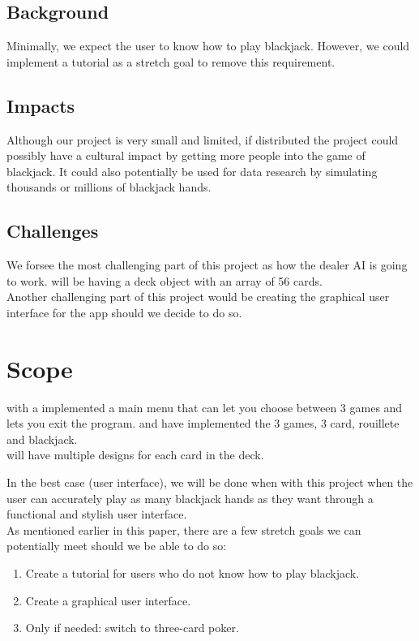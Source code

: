 \documentclass[10pt,conference,onecolumn,compsoc]{IEEEtran}
\begin{document}
\subsection{Background}
Minimally, we expect the user to know how to play blackjack. However, we could implement a tutorial as a stretch goal to remove this requirement.

\subsection{Impacts}
Although our project is very small and limited, if distributed the project could possibly have a cultural impact by getting more people into the game of blackjack. It could also potentially be used for data research by simulating thousands or millions of blackjack hands.
\subsection{Challenges}
We forsee the most challenging part of this project as how the dealer AI is going to work. will be having a deck object with an array of 56 cards. 
\\
Another challenging part of this project would be creating the graphical user interface for the app should we decide to do so.



\section{Scope}
with a implemented a main menu that can let you choose between 3 games and lets you exit the program. and have implemented the 3 games, 3 card, rouillete and blackjack.\\
will have multiple designs for each card in the deck. 

In the best case (user interface), we will be done when with this project when the user can accurately play as many blackjack hands as they want through a functional and stylish user interface.\\
As mentioned earlier in this paper, there are a few stretch goals we can potentially meet should we be able to do so:\\

\begin{enumerate}
\item Create a tutorial for users who do not know how to play blackjack.
\item Create a graphical user interface.
\item Only if needed: switch to three-card poker.
\end{enumerate}


\end{document}
